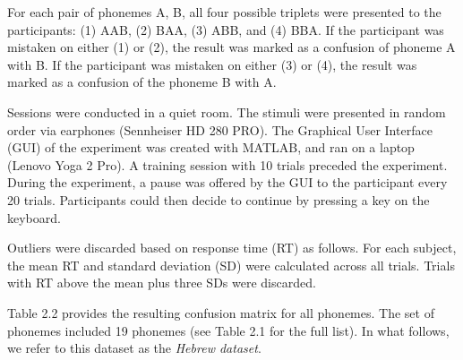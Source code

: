 For each pair of phonemes {A, B}, all four possible triplets were presented to the participants: (1) AAB, (2) BAA, (3) ABB, and (4) BBA. If the participant was mistaken on either (1) or (2), the result was marked as a confusion of phoneme A with B. If the participant was mistaken on either (3) or (4), the result was marked as a confusion of the phoneme B with A. 

Sessions were conducted in a quiet room. The stimuli were presented in random order via earphones (Sennheiser HD 280 PRO). The Graphical User Interface (GUI) of the experiment was created with MATLAB, and ran on a laptop (Lenovo Yoga 2 Pro). A training session with 10 trials preceded the experiment. During the experiment, a pause was offered by the GUI to the participant every 20 trials. Participants could then decide to continue by pressing a key on the keyboard.

Outliers were discarded based on response time (RT) as follows. For each subject, the mean RT and standard deviation (SD) were calculated across all trials. Trials with RT above the mean plus three SDs were discarded.

Table 2.2 provides the resulting confusion matrix for all phonemes. The set of phonemes included 19 phonemes (see Table 2.1 for the full list). In what follows, we refer to this dataset as the \textit{Hebrew dataset}.

